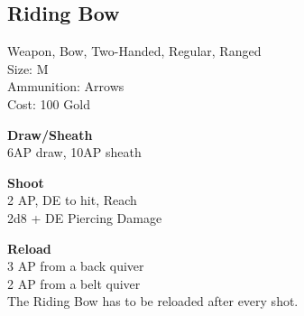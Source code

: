 \subsection{Riding Bow}\label{weapon:ridingBow}
Weapon, Bow, Two-Handed, Regular, Ranged\\
Size: M\\
Ammunition: Arrows\\
Cost: 100 Gold

\textbf{Draw/Sheath}\\
6AP draw, 10AP sheath

\textbf{Shoot}\\
2 AP, DE to hit,  Reach\\
2d8 + \texttimes DE Piercing Damage

\textbf{Reload}\\
3 AP from a back quiver\\
2 AP from a belt quiver\\
The Riding Bow has to be reloaded after every shot.

